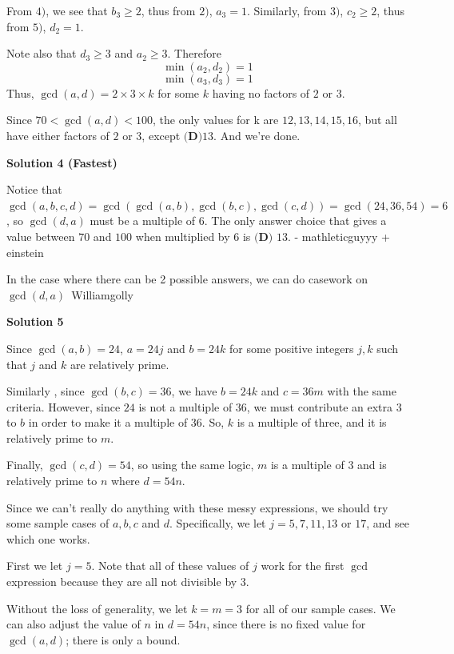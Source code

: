 \begin{enumerate}
 From $4)$, we see that $b_3 \geq 2$, thus from $2)$, $a_3 = 1$. Similarly, from $3)$, $c_2 \geq 2$, thus from $5)$, $d_2 = 1$. 

 Note also that $d_3 \geq 3$ and $a_2 \geq 3$. Therefore 
 \[\min(a_2, d_2) = 1\] 
 \[\min(a_3, d_3) = 1\] Thus, $\gcd(a, d) = 2 \times 3 \times k$ for some $k$ having no factors of $2$ or $3$. 

 Since $70 < \gcd(a, d) < 100$, the only values for k are $12, 13, 14, 15, 16$, but all have either factors of $2$ or $3$, except $\boxed{\textbf{(D)} 13}$. And we're done. 

 



\textbf{Solution 4 (Fastest)}

Notice that $\gcd (a,b,c,d)=\gcd(\gcd(a,b),\gcd(b,c),\gcd(c,d))=\gcd(24,36,54)=6$, so $\gcd(d,a)$ must be a multiple of $6$. The only answer choice that gives a value between $70$ and $100$ when multiplied by $6$ is $\boxed{\textbf{(D) } 13}$. - mathleticguyyy + einstein

 In the case where there can be 2 possible answers, we can do casework on $\gcd(d,a)$~Williamgolly

 



\textbf{Solution 5}

Since $\gcd (a,b) = 24$, $a = 24j$ and $b = 24k$ for some positive integers $j,k$ such that $j$ and $k$ are relatively prime. 

 Similarly , since $\gcd (b,c) = 36$, we have $b = 24k$ and $c=36m$ with the same criteria. However, since $24$ is not a multiple of $36$, we must contribute an extra $3$ to $b$ in order to make it a multiple of $36$. So, $k$ is a multiple of three, and it is relatively prime to $m$.

 Finally, $\gcd (c,d) = 54$, so using the same logic, $m$ is a multiple of $3$ and is relatively prime to $n$ where $d = 54n$.

 Since we can't really do anything with these messy expressions, we should try some sample cases of $a,b,c$ and $d$. Specifically, we let $j = 5, 7, 11, 13$ or $17$, and see which one works.

 First we let $j= 5$. Note that all of these values of $j$ work for the first $\gcd$ expression because they are all not divisible by $3$.

 Without the loss of generality, we let $k=m=3$ for all of our sample cases. We can also adjust the value of $n$ in $d=54n$, since there is no fixed value for $\gcd(a,d)$; there is only a bound.


\end{enumerate}
